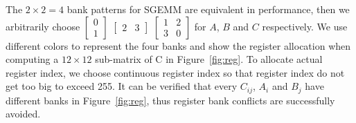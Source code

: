 The $2\times2=4$ bank patterns for SGEMM are equivalent in performance, then we arbitrarily
choose $\begin{bmatrix} 0 \\ 1  \end{bmatrix}$ $\begin{bmatrix} 2 & 3 \end{bmatrix}$
    $\begin{bmatrix} 1 & 2 \\ 3 & 0  \end{bmatrix}$ for $A$, $B$ and $C$ respectively.
We use different colors to represent the four banks and show the register allocation when computing a $12 \times 12$ sub-matrix of C in Figure~\ref{fig:reg}.
To allocate actual register index, we choose continuous register index so that register index do not get too big to exceed 255. 
It can be verified that every $C_{ij}$, $A_i$ and $B_j$ have different banks in Figure~\ref{fig:reg}, thus register bank conflicts are successfully avoided.
